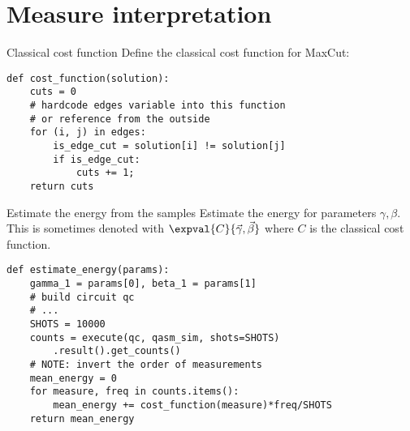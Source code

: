 \section{Measure interpretation}
\SectionPage{}

\begin{frame}[fragile]{Classical cost function}
Define the classical cost function for MaxCut:

\begin{verbatim}
def cost_function(solution):
    cuts = 0
    # hardcode edges variable into this function 
    # or reference from the outside
    for (i, j) in edges:
        is_edge_cut = solution[i] != solution[j]
        if is_edge_cut:
            cuts += 1;
    return cuts
\end{verbatim}
\end{frame}

\begin{frame}[fragile]{Estimate the energy from the samples}
Estimate the energy for parameters \(\gamma, \beta\). This is sometimes denoted with \(\expval{C}{\vec{\gamma}, \vec{\beta}}\) where \(C\) is the classical cost function. \bigskip

\begin{verbatim}
def estimate_energy(params):
    gamma_1 = params[0], beta_1 = params[1]
    # build circuit qc
    # ...
    SHOTS = 10000
    counts = execute(qc, qasm_sim, shots=SHOTS)
        .result().get_counts()
    # NOTE: invert the order of measurements
    mean_energy = 0
    for measure, freq in counts.items():
        mean_energy += cost_function(measure)*freq/SHOTS
    return mean_energy
\end{verbatim}
\end{frame}